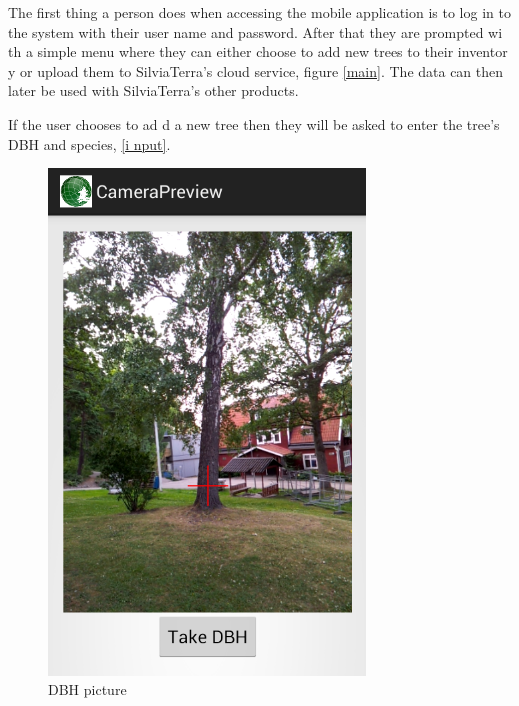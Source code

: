 The first thing a person does when accessing the mobile application is to log in
to the system with their user name and password. After that they are prompted wi
th a simple menu where they can either choose to add new trees to their inventor
y or upload them to SilviaTerra's cloud service, figure \ref{main}. 
The data can then later be used with SilviaTerra's other products. 
 
 If the user chooses to ad
d a new tree then they will be asked to enter the tree's DBH and species, \ref{i
nput}. 
\begin{figure}[!htb]
		\centering
  		\includegraphics[width=0.75\textwidth]{dbh.png}
	  	\caption{DBH picture}
	  	\label{dbh}
	\endminipage\hfill
		\centering

\end{figure}
